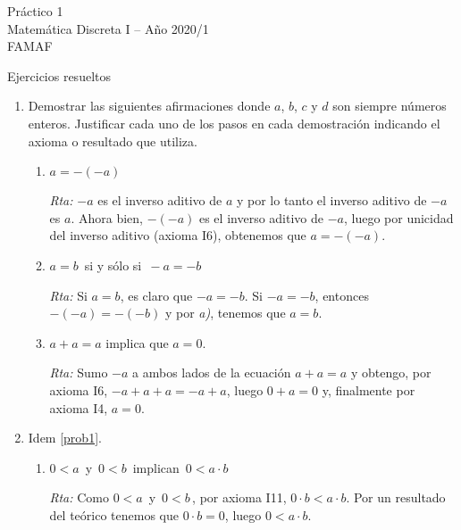 \documentclass[12pt,spanish,makeidx]{amsbook}
\newcommand{\rta}{\noindent\textit{Rta: }}
\begin{document}
	
	
	
	{\bf \begin{center} Práctico 1 \\ Matemática Discreta I -- Año 2020/1 \\ FAMAF \end{center}}
	
	{\bf \begin{center} Ejercicios resueltos \end{center}}
	
	\smallskip
	
	\begin{enumerate}
		
		
		\item\label{prob1} Demostrar las siguientes afirmaciones donde $a$, $b$, $c$ y $d$ son siempre números enteros. Justificar cada uno de los pasos en cada demostración indicando el axioma o resultado que utiliza.
		\begin{enumerate}
			\item  $a=-(-a)$
			
			\rta $-a$  es el inverso aditivo de $a$ y por lo tanto el inverso aditivo de $-a$ es $a$.  Ahora bien, $-(-a)$  es el inverso aditivo de  $-a$, luego por  unicidad del inverso aditivo (axioma { I6}), obtenemos que $a = -(-a)$.
			
			\item  $a=b\,$ si y sólo si $\,-a=-b$
			
			\rta Si  $a=b$, es claro que $-a=-b$. Si $-a= -b$, entonces $-(-a) = -(-b)$ y  por \textit{a)}, tenemos que $a=b$.  
			
			\item  $a+a=a$ implica que  $a=0$.
			
			\rta Sumo $-a$ a ambos lados de la ecuación  $a+a=a$ y obtengo, por axioma I6,  $-a + a + a = -a +a$, luego $0 +a = 0$ y, finalmente por axioma I4, $a=0$. 
			
		\end{enumerate}
		
		
		\medskip
		
		\item Idem \ref{prob1}.
		
		\begin{enumerate}
			\item $0<a\,$ y $\,0<b\,$ implican $\,0<a\cdot b$
			
			\rta Como $0<a\,$ y $\,0<b\,$, por axioma I11, $0 \cdot b < a \cdot b$. Por un resultado del teórico  tenemos que $0 \cdot b = 0$, luego $0 < a\cdot b$.
			

\end{enumerate}
\end{enumerate}
\end{document}
